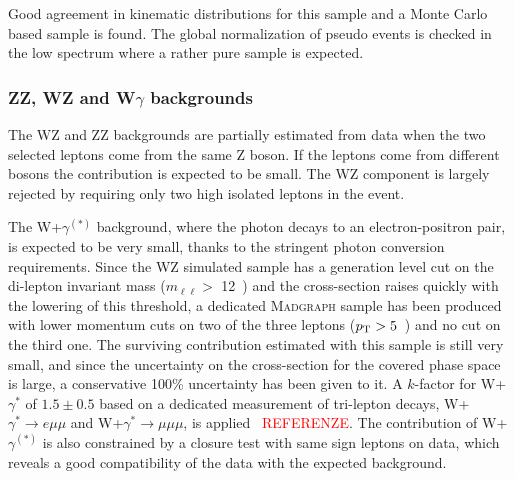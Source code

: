 Good agreement in kinematic distributions for this sample
and a Monte Carlo based \dytt sample is found.
The global normalization of pseudo \dytt events is 
checked in the low \mt spectrum where a rather pure
\dytt sample is expected.


	\subsubsection{ZZ, WZ and W\texorpdfstring{$\gamma$}{gamma} backgrounds\label{sec:otherbkg}}

The WZ and ZZ backgrounds are partially estimated from data when the two
selected leptons come from the same Z boson. If the leptons come from different
bosons the contribution is expected to be small. The WZ component is largely
rejected by requiring only two high \pt isolated leptons in the event. 

The W+$\gamma^{(*)}$ background, where the photon decays to an electron-positron pair,
is expected to be very small, thanks to the stringent photon conversion
requirements.
 Since the WZ simulated sample has a generation level cut on the
di-lepton invariant mass ($m_{\ell\ell} >$ 12~\GeV) and the cross-section raises
quickly with the lowering of this threshold, a dedicated \textsc{Madgraph} sample has
been produced with lower momentum cuts on two of the three leptons
($p_\mathrm{T} > 5$~\GeV) and no cut on the third one. The surviving contribution
estimated with this sample is still very small, and since the uncertainty on the
cross-section for the covered phase space is large, a conservative 100\%
uncertainty has been given to it. 
A $k$-factor for W+$\gamma^{*}$ of $1.5\pm0.5$ based on a dedicated measurement of 
tri-lepton decays, W+$\gamma^{*} \to e\mu\mu$ and W+$\gamma^{*} \to \mu\mu\mu$,
is applied~\cite{WGammaStarStudy} \textcolor{red}{REFERENZE}. 
The contribution of W+$\gamma^{(*)}$ is also
constrained by a closure test with same sign leptons on data, which reveals a
good compatibility of the data with the expected background.

